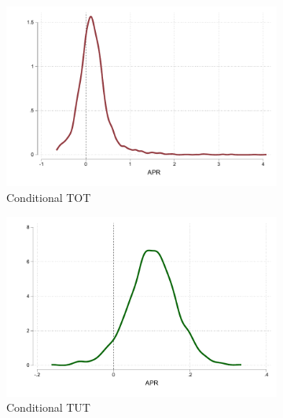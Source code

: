 \documentclass[12pt, a4paper, colorinlistoftodos]{article}
\begin{document}
\vspace{.2in}
\begin{figure}[!h]
     \caption{Heterogeneous Treatment Effects.} 
     \label{heterogeneous_effects}    
    \begin{center}
     \begin{subfigure}{0.35\textwidth}
       \centering
      \includegraphics[width=\textwidth]{Figuras/he_dist_tau_hat_tot.pdf}
          \caption{Conditional TOT}
    \end{subfigure}
    \begin{subfigure}{0.35\textwidth}
       \centering
      \includegraphics[width=\textwidth]{Figuras/he_dist_tau_hat_tut.pdf}
          \caption{Conditional TUT}
    \end{subfigure} 
       \begin{subfigure}{.35\textwidth}
        \centering

\end{subfigure}
\end{center}
\end{figure}
\end{document}
